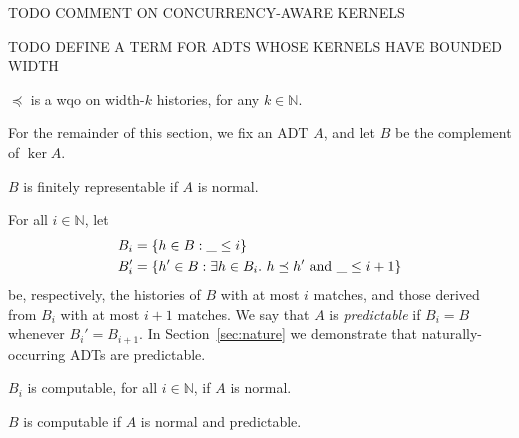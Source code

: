 TODO COMMENT ON CONCURRENCY-AWARE KERNELS

TODO DEFINE A TERM FOR ADTS WHOSE KERNELS HAVE BOUNDED WIDTH

\begin{lemma}

  $\preceq$ is a wqo on width-$k$ histories, for any $k \in \mathbb{N}$.

\end{lemma}

For the remainder of this section, we fix an ADT $A$, and let $B$ be the
complement of $\ker A$.

\begin{lemma}

  $B$ is finitely representable if $A$ is normal.

\end{lemma}

For all $i \in \mathbb{N}$, let
\begin{align*}
  B_i &= {\{{ h \in B : \_ \le i }\}} \\
  B_i' &= {\{{ h' \in B :
    \exists h \in B_i.\ h \preceq h' \text{ and } \_ \le i+1
  }\}}
\end{align*}
be, respectively, the histories of $B$ with at most $i$ matches, and those
derived from $B_i$ with at most $i\!+\!1$ matches. We say that $A$ is
\emph{predictable} if $B_i = B$ whenever $B_i' = B_{i+1}$. In 
Section~\ref{sec:nature} we demonstrate that naturally-occurring ADTs are
predictable.

\begin{lemma}

  $B_i$ is computable, for all $i \in \mathbb{N}$, if $A$ is normal.

\end{lemma}

\begin{lemma}

  $B$ is computable if $A$ is normal and predictable.

\end{lemma}
